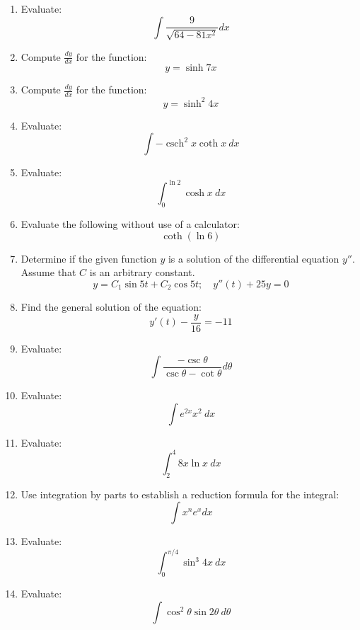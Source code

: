 \documentclass[fleqn]{article}
\DeclareMathOperator{\csch}{csch}
\begin{document}
\begin{enumerate}
\item Evaluate:
\[\int\frac{9}{\sqrt{64-81x^2}}dx\]

\item Compute \(\frac{dy}{dx}\) for the function:
\[y=\sinh 7x\]

\item Compute \(\frac{dy}{dx}\) for the function:
\[y=\sinh^2 4x\]

\item Evaluate:
\[\int-\csch^2 x\coth x\ dx\]

\item Evaluate:
\[\int_0^{\ln 2}\cosh x\ dx\]

\item Evaluate the following without use of a calculator:
\[\coth(\ln 6)\]

\item Determine if the given function \(y\) is a solution of the differential equation
\(y''\). Assume that \(C\) is an arbitrary constant.
\[y=C_1\sin 5t+C_2\cos 5t;\quad y''(t)+25y=0\]

\item Find the general solution of the equation:
\[y'(t)-\frac{y}{16}=-11\]

\item Evaluate:
\[\int\frac{-\csc\theta}{\csc\theta-\cot\theta}d\theta\]

\item Evaluate:
\[\int e^{2x}x^2\ dx\]

\item Evaluate:
\[\int_2^4 8x\ln x\ dx\]

\item Use integration by parts to establish a reduction formula for the integral:
\[\int x^n e^x dx\]

\item Evaluate:
\[\int_0^{\pi/4}\sin^3 4x\ dx\]

\item Evaluate:
\[\int\cos^2\theta\sin 2\theta\ d\theta\]

\end{enumerate}
\end{document}
